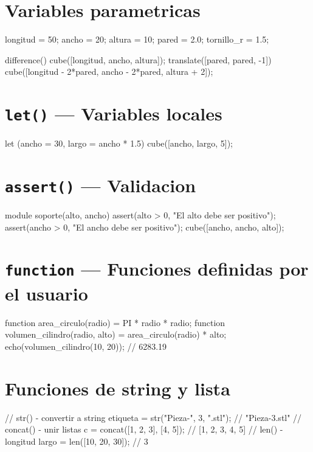 \documentclass[12pt, oneside, a4paper]{report}
\newcommand{\codigo}[1]{\texttt{#1}}
\begin{document}
\section{Variables parametricas}
\begin{openscad}
longitud = 50; ancho = 20; altura = 10;
pared = 2.0; tornillo_r = 1.5;

difference() {
    cube([longitud, ancho, altura]);
    translate([pared, pared, -1])
        cube([longitud - 2*pared, ancho - 2*pared, altura + 2]);
}
\end{openscad}

\section{\codigo{let()} --- Variables locales}
\begin{openscad}
let (ancho = 30, largo = ancho * 1.5) {
    cube([ancho, largo, 5]);
}
\end{openscad}

\section{\codigo{assert()} --- Validacion}
\begin{openscad}
module soporte(alto, ancho) {
    assert(alto > 0, "El alto debe ser positivo");
    assert(ancho > 0, "El ancho debe ser positivo");
    cube([ancho, ancho, alto]);
}
\end{openscad}

\section{\codigo{function} --- Funciones definidas por el usuario}
\begin{openscad}
function area_circulo(radio) = PI * radio * radio;
function volumen_cilindro(radio, alto) = area_circulo(radio) * alto;
echo(volumen_cilindro(10, 20));  // 6283.19
\end{openscad}

\section{Funciones de string y lista}
\begin{openscad}
// str() - convertir a string
etiqueta = str("Pieza-", 3, ".stl");  // "Pieza-3.stl"
// concat() - unir listas
c = concat([1, 2, 3], [4, 5]);       // [1, 2, 3, 4, 5]
// len() - longitud
largo = len([10, 20, 30]);           // 3
\end{openscad}
\end{document}
